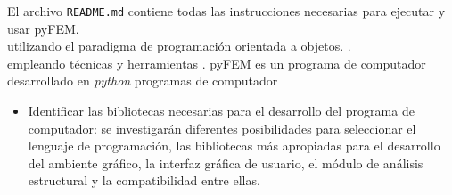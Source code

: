 El archivo \verb|README.md| contiene todas las instrucciones necesarias para ejecutar y usar pyFEM.\\

utilizando el paradigma de programación orientada a objetos. .\\

empleando técnicas y herramientas . pyFEM es un programa de computador desarrollado en \emph{python}  programas de computador 
\begin{itemize}
\item Identificar las bibliotecas necesarias para el desarrollo del programa de computador: se investigarán diferentes posibilidades para seleccionar el lenguaje de programación, las bibliotecas más apropiadas para el desarrollo del ambiente gráfico, la interfaz gráfica de usuario, el módulo de análisis estructural y la compatibilidad entre ellas.
  
\end{itemize}





